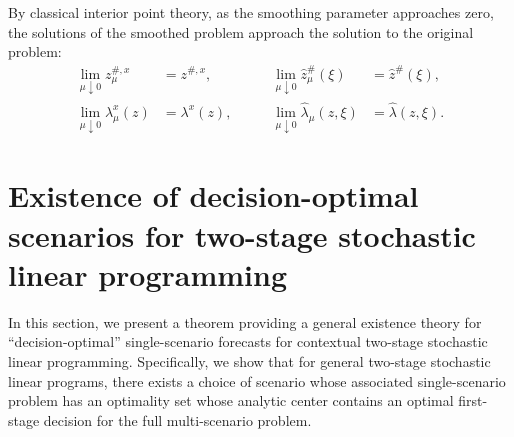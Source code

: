 \documentclass{article}
\theoremstyle{plain}
\theoremstyle{definition}
\theoremstyle{remark}
\begin{document}
By classical interior point theory, as the smoothing parameter approaches zero, the solutions of
the smoothed problem approach the solution to the original problem:
\begin{equation}
\label{eq:contextual-central-path}
\begin{aligned}
\lim_{\mu\downarrow 0} z_\mu^{\#,x} &= z^{\#,x},
\qquad &
\lim_{\mu\downarrow 0} \hat z_\mu^{\#}(\xi) &= \hat z^{\#}(\xi),\\
\lim_{\mu\downarrow 0} \lambda_\mu^x(z) &= \lambda^x(z),
\qquad &
\lim_{\mu\downarrow 0} \hat\lambda_\mu(z,\xi) &= \hat\lambda(z,\xi).
\end{aligned}
\end{equation}

\section{Existence of decision-optimal scenarios for two-stage stochastic linear programming}
\label{sec:existence}

In this section, we present a theorem providing a general existence theory for ``decision-optimal'' single-scenario forecasts for contextual two-stage stochastic linear programming. Specifically, we show that for general two-stage stochastic linear programs, there exists a choice of scenario whose associated single-scenario problem has an optimality set whose analytic center contains an optimal first-stage decision for the full multi-scenario problem.
\end{document}
